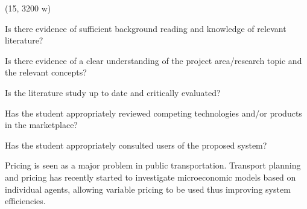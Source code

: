 (15, 3200 w)

Is there evidence of sufficient background reading and knowledge of relevant
literature?

Is there evidence of a clear understanding of the project area/research topic
and the relevant concepts?

Is the literature study up to date and critically evaluated?

Has the student appropriately reviewed competing technologies and/or products
in the marketplace?

Has the student appropriately consulted users of the proposed system?


Pricing is seen as a major problem in public transportation.
Transport planning and pricing has recently started to investigate
microeconomic models based on individual agents, allowing variable pricing to
be used thus improving system efficiencies. \parencite{Emele2013pricing+rural,
Kaddoura2013social+cost, Neumann2011berlin}
